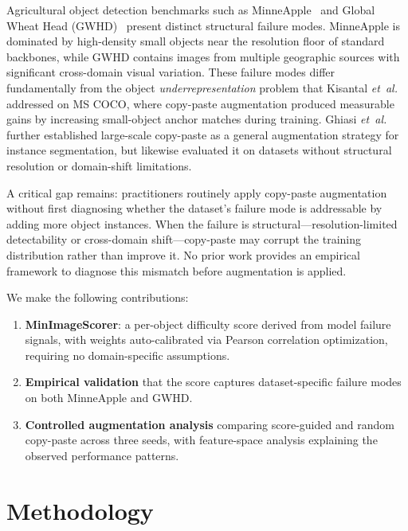 \documentclass[conference]{IEEEtran}
\begin{document}
Agricultural object detection benchmarks such as
MinneApple~\cite{hani2020minneapple} and Global Wheat Head
(GWHD)~\cite{david2021global} present distinct structural failure
modes. MinneApple is dominated by high-density small objects near the
resolution floor of standard backbones, while GWHD contains images
from multiple geographic sources with significant cross-domain visual
variation. These failure modes differ fundamentally from the object
\textit{underrepresentation} problem that Kisantal
\textit{et~al.}~\cite{kisantal2019augmentation} addressed on MS COCO,
where copy-paste augmentation produced measurable gains by increasing
small-object anchor matches during training. Ghiasi
\textit{et~al.}~\cite{ghiasi2021simple} further established
large-scale copy-paste as a general augmentation strategy for instance
segmentation, but likewise evaluated it on datasets without structural
resolution or domain-shift limitations.

A critical gap remains: practitioners routinely apply copy-paste
augmentation without first diagnosing whether the dataset's failure
mode is addressable by adding more object instances. When the failure
is structural---resolution-limited detectability or cross-domain
shift---copy-paste may corrupt the training distribution rather than
improve it. No prior work provides an empirical framework to diagnose
this mismatch before augmentation is applied.

We make the following contributions:
\begin{enumerate}
    \item \textbf{MinImageScorer}: a per-object difficulty score
    derived from model failure signals, with weights auto-calibrated
    via Pearson correlation optimization, requiring no domain-specific
    assumptions.
    \item \textbf{Empirical validation} that the score captures
    dataset-specific failure modes on both MinneApple and GWHD.
    \item \textbf{Controlled augmentation analysis} comparing
    score-guided and random copy-paste across three seeds, with
    feature-space analysis explaining the observed performance
    patterns.
\end{enumerate}

\section{Methodology}
\end{document}
